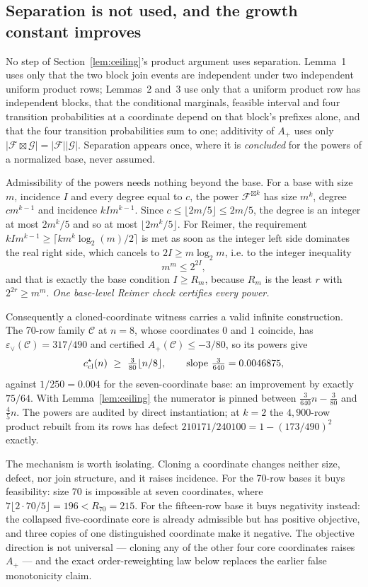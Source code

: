 \documentclass[11pt]{article}
\theoremstyle{remark}
\newcommand{\F}{\mathcal F}
\newcommand{\G}{\mathcal G}
\newcommand{\eps}{\varepsilon}
\begin{document}
\subsection{Separation is not used, and the growth constant improves}

No step of Section~\ref{lem:ceiling}'s product argument uses separation.
Lemma~1 uses only that the two block join events are independent under two
independent uniform product rows; Lemmas~2 and~3 use only that a uniform product
row has independent blocks, that the conditional marginals, feasible interval and
four transition probabilities at a coordinate depend on that block's prefixes
alone, and that the four transition probabilities sum to one; additivity of
$A_+$ uses only $|\F\boxtimes\G|=|\F||\G|$.  Separation appears once, where it is
\emph{concluded} for the powers of a normalized base, never assumed.

Admissibility of the powers needs nothing beyond the base.  For a base with size
$m$, incidence $I$ and every degree equal to $c$, the power $\F^{\boxtimes k}$
has size $m^k$, degree $cm^{k-1}$ and incidence $kIm^{k-1}$.  Since
$c\le\lfloor2m/5\rfloor\le2m/5$, the degree is an integer at most $2m^k/5$ and so
at most $\lfloor2m^k/5\rfloor$.  For Reimer, the requirement
$kIm^{k-1}\ge\lceil km^k\log_2(m)/2\rceil$ is met as soon as the integer left
side dominates the real right side, which cancels to $2I\ge m\log_2m$, i.e. to
the integer inequality
\[
  m^m\le2^{2I},
\]
and that is exactly the base condition $I\ge R_m$, because $R_m$ is the least $r$
with $2^{2r}\ge m^m$.  \emph{One base-level Reimer check certifies every power.}

Consequently a cloned-coordinate witness carries a valid infinite construction.
The 70-row family $\mathcal C$ at $n=8$, whose coordinates $0$ and $1$ coincide,
has $\eps_\vee(\mathcal C)=317/490$ and certified $A_+(\mathcal C)\le-3/80$, so
its powers give
\[
  c^\star_{\rm cl}(n)\ \ge\ \tfrac3{80}\lfloor n/8\rfloor,
  \qquad\text{slope } \tfrac3{640}=0.0046875,
\]
against $1/250=0.004$ for the seven-coordinate base: an improvement by exactly
$75/64$.  With Lemma~\ref{lem:ceiling} the numerator is pinned between
$\tfrac3{640}n-\tfrac3{80}$ and $\tfrac45n$.  The powers are audited by direct
instantiation; at $k=2$ the $4{,}900$-row product rebuilt from its rows has
defect $210171/240100=1-(173/490)^2$ exactly.

The mechanism is worth isolating.  Cloning a coordinate changes neither size,
defect, nor join structure, and it raises incidence.  For the 70-row bases it
buys feasibility: size 70 is impossible at seven coordinates, where
$7\lfloor2\cdot70/5\rfloor=196<R_{70}=215$.  For the fifteen-row base it buys
negativity instead: the collapsed five-coordinate core is already admissible
but has positive objective, and three copies of one distinguished coordinate
make it negative.  The objective direction is not universal --- cloning any of
the other four core coordinates raises $A_+$ --- and the exact order-reweighting
law below replaces the earlier false monotonicity claim.
\end{document}
